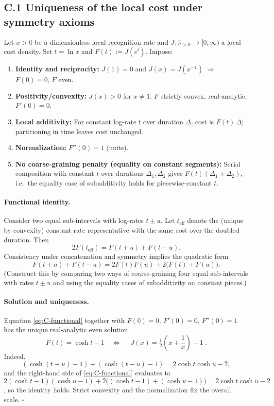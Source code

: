 \documentclass[11pt,letterpaper]{article}
\begin{document}
\subsection*{C.1 Uniqueness of the local cost under symmetry axioms}

Let $x>0$ be a dimensionless local recognition rate and $J:\mathbb R_{>0}\to[0,\infty)$ a local cost density. Set $t=\ln x$ and $F(t):=J(e^t)$. Impose:

\begin{enumerate}
\item \textbf{Identity and reciprocity:} $J(1)=0$ and $J(x)=J(x^{-1})$ $\Rightarrow$ $F(0)=0$, $F$ even.
\item \textbf{Positivity/convexity:} $J(x)>0$ for $x\neq 1$; $F$ strictly convex, real-analytic, $F'(0)=0$.
\item \textbf{Local additivity:} For constant log-rate $t$ over duration $\Delta$, cost is $F(t)\,\Delta$; partitioning in time leaves cost unchanged.
\item \textbf{Normalization:} $F''(0)=1$ (units).
\item \textbf{No coarse-graining penalty (equality on constant segments):} Serial composition with constant $t$ over durations $\Delta_1,\Delta_2$ gives $F(t)(\Delta_1+\Delta_2)$, i.e.\ the equality case of subadditivity holds for piecewise-constant $t$.
\end{enumerate}

\paragraph{Functional identity.}
Consider two equal sub-intervals with log-rates $t\pm u$. Let $t_{\mathrm{eff}}$ denote the (unique by convexity) constant-rate representative with the same cost over the doubled duration. Then
\begin{equation}
2F(t_{\mathrm{eff}})=F(t+u)+F(t-u).
\end{equation}
Consistency under concatenation and symmetry implies the quadratic form
\begin{equation}
F(t+u)+F(t-u)=2F(t)F(u)+2\bigl(F(t)+F(u)\bigr).
\label{eq:C-functional}
\end{equation}
(Construct this by comparing two ways of coarse-graining four equal sub-intervals with rates $t\pm u$ and using the equality cases of subadditivity on constant pieces.)

\paragraph{Solution and uniqueness.}
Equation \eqref{eq:C-functional} together with $F(0)=0$, $F'(0)=0$, $F''(0)=1$ has the unique real-analytic even solution
\begin{equation}
F(t)=\cosh t - 1
\quad\Longleftrightarrow\quad
\boxed{\;J(x)=\tfrac12\!\left(x+\frac1x\right)-1\;}.
\end{equation}
Indeed,
\[
(\cosh(t+u)-1)+(\cosh(t-u)-1)=2\cosh t\cosh u -2,
\]
and the right-hand side of \eqref{eq:C-functional} evaluates to
$2(\cosh t-1)(\cosh u-1)+2\bigl((\cosh t-1)+(\cosh u-1)\bigr)=2\cosh t\cosh u-2$,
so the identity holds. Strict convexity and the normalization fix the overall scale. \hfill$\square$
\end{document}
